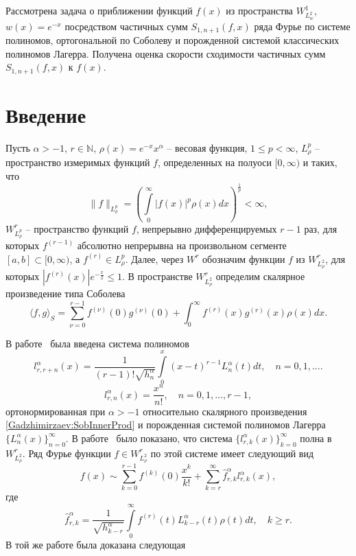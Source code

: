 Рассмотрена задача о приближении функций $f(x)$ из пространства $W^1_{L^2_w}$, $w(x)=e^{-x}$ посредством частичных сумм $S_{1,n+1}(f,x)$ ряда Фурье по системе полиномов, ортогональной по Соболеву и порожденной системой классических полиномов Лагерра.
Получена оценка скорости сходимости частичных сумм  $S_{1,n+1}(f,x)$ к $f(x)$.


\section*{Введение}

Пусть $\alpha>-1$, $r\in \mathbb{N}$, $\rho(x)=e^{-x}x^\alpha$ -- весовая функция, $1\le p<\infty$, $L^p_\rho$ -- пространство измеримых функций $f$, определенных на полуоси $[0, \infty)$ и таких, что
$$
\|f\|_{L^p_\rho}=\left(\int\limits_0^{\infty}|f(x)|^p\rho(x) dx\right)^\frac{1}{p}<\infty,
$$
$W^r_{L^p_\rho}$ -- пространство функций $f$, непрерывно дифференцируемых $r-1$ раз, для которых $f^{(r-1)}$ абсолютно непрерывна на произвольном сегменте $[a, b]\subset[0, \infty)$, а $f^{(r)}\in L^p_\rho$.
Далее, через $W^r$ обозначим функции $f$ из $W^r_{L^2_\rho}$, для которых $|f^{(r)}(x)|e^{-\frac x2}\le 1$. В пространстве $W^r_{L^2_\rho}$ определим скалярное произведение типа Соболева
\begin{equation}\label{Gadzhimirzaev:SobInnerProd}
\langle f,g\rangle_S=\sum_{\nu=0}^{r-1}f^{(\nu)}(0)g^{(\nu)}(0)+\int_{0}^{\infty} f^{(r)}(x)g^{(r)}(x)\rho(x)dx.
\end{equation}

В работе~\cite{Gadzhimirzaev:DEMR2016} была введена система полиномов
\begin{equation*}
l_{r,r+n}^{\alpha}(x) =\frac{1}{(r-1)!\sqrt{h_n^\alpha}}\int\limits_{0}^x(x-t)^{r-1}L_{n}^{\alpha}(t)dt, \quad n=0,1,\ldots.
\end{equation*}
\begin{equation*}
l_{r,n}^{\alpha}(x) =\frac{x^n}{n!}, \quad n=0,1,\ldots, r-1,
\end{equation*}
ортонормированная при $\alpha>-1$ относительно скалярного произведения \eqref{Gadzhimirzaev:SobInnerProd} и порожденная системой полиномов Лагерра $\{L_{n}^{\alpha}(x)\}_{n=0}^\infty$.
В работе~\cite{Gadzhimirzaev:ShII-MMG} было показано, что система $\{l^\alpha_{r,k}(x)\}_{k=0}^\infty$ полна в $W^r_{L^2_\rho}$. Ряд Фурье функции $f\in W^r_{L^2_\rho}$ по этой системе имеет следующий вид
\begin{equation}\label{Gadzhimirzaev:Fourier_Series}
f(x)\sim \sum_{k=0}^{r-1}f^{(k)}(0)\frac{x^k}{k!}+\sum_{k=r}^{\infty} \hat{f}_{r,k}^\alpha l_{r,k}^\alpha(x),
\end{equation}
где
\begin{equation*}
\hat{f}_{r,k}^\alpha=\frac{1}{\sqrt{h_{k-r}^\alpha}}\int\limits_0^\infty f^{(r)}(t)L_{k-r}^\alpha(t)\rho(t)dt, \quad k\ge r.
\end{equation*}
В той же работе была доказана следующая

